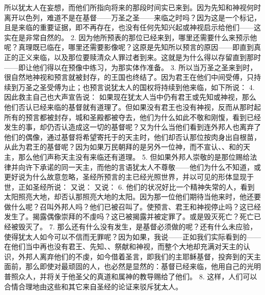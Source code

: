 所以犹太人在妄想，而他们所指向将来的那段时间实已来到。因为先知和神视何时离开以色列，难道不是在基督——万圣之圣——来临之时吗？因为这是一个标记，且是来临的重要证据，即不再存在，也没有任何先知兴起或神视启示给他们——这实在是非常自然的。 2. 因为他所预表的那位已经来到，哪里还需要什么来预示他呢？真理既已临在，哪里还需要影像呢？这原是先知所以预言的原因——即直到真正的正义来临，以及那位要赎清众人罪过者到来。这就是为什么得以存留直到那时——即让他们得以在预像中练习，为那实体作准备。 3. 所以当万圣之圣来到时，很自然地神视和预言就被封存，的王国也终结了。因为君王在他们中间受傅，只持续到万圣之圣受傅为止；也预言说犹太人的国权将持续到他来临，如下所说： 4. 因此救主自己也大声宣告说： 如果现在犹太人当中仍有君王或先知或神视，那么他们否认已经来临的基督就有道理了。但如果没有君王也没有神视，反而从那时起所有的预言都被封存，城和圣殿都被夺去，他们为什么如此不敬和刚愎，看到已经发生的事，却仍否认造成这一切的基督呢？又为什么当他们看到连外邦人也离弃了他们的偶像，通过基督将希望寄托于的天主时，他们却否认那位按肉身出自根苗，从此为君王的基督呢？因为如果万民朝拜的是另外一位神，而不宣认、、和的天主，那么他们声称天主没有来临还有道理。 5. 但如果外邦人崇敬的是那位赐给法律并向许下承诺的同一天主，而他的言语犹太人不尊敬——他们为什么不知道，或更好说为什么故意忽略，圣经所预言的主已经光照世界，并以可见的形体显现于世，正如圣经所说： 又说： 又说： 6. 他们的状况好比一个精神失常的人，看到太阳照亮大地，却否认那照亮大地的太阳。因为那一位他们期待当他来时，他还要做什么呢？召叫外邦人吗？他们已被召叫了。使预言、君王和神视停止吗？这已经发生了。揭露偶像崇拜的不虔吗？这已被揭露并被定罪了。或是毁灭死亡？死亡已经被毁灭了。 7. 那么还有什么没有发生，是基督必须做的呢？还有什么未应验，使得犹太人如今可以不信而无罪呢？因为如果，我说——正如我们实际看到的——在他们当中再也没有君王、先知、、祭献和神视，而整个大地却充满对天主的认识，外邦人离弃他们的不虔，如今借着圣言，即我们的主耶稣基督，投奔到的天主面前，那么即使对最顽固的人，也必然是显然的：基督已经来临，他用自己的光明普照众人，并将关于他圣父的真道和属神的教导赐给了他们。 8. 这样，人们可以合情合理地由这些和其它来自圣经的论证来驳斥犹太人。\par

